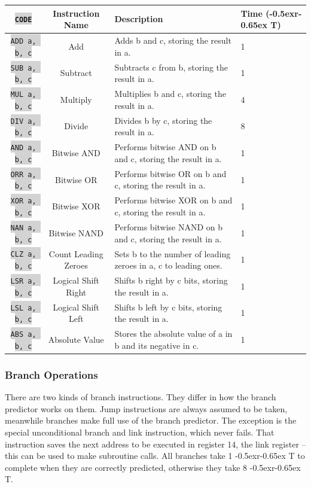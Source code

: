 \documentclass{article}
\newcommand{\vnscode}[1]{\colorbox{lightgray}{\lstinline[language=vns]{#1}}}
\newcommand{\RT}{\lower-0.5ex\hbox{r}\kern-0.65ex T}
\begin{document}
\begin{minipage}{\textwidth}
\label{table:arithmetic}
\centering
\begin{tabular}{|c|c|l|l|}
    \hline \vnscode{CODE} & Instruction Name & Description & Time (\RT) \\ \hline
    \vnscode{ADD a, b, c} & Add & Adds b and c, storing the result in a. & 1 \\ \hline
    \vnscode{SUB a, b, c} & Subtract & Subtracts c from b, storing the result in a. & 1 \\ \hline
    \vnscode{MUL a, b, c} & Multiply & Multiplies b and c, storing the result in a. & 4 \\ \hline
    \vnscode{DIV a, b, c} & Divide & Divides b by c, storing the result in a. & 8 \\ \hline
    \vnscode{AND a, b, c} & Bitwise AND & Performs bitwise AND on b and c, storing the result in a. & 1 \\ \hline
    \vnscode{ORR a, b, c} & Bitwise OR & Performs bitwise OR on b and c, storing the result in a. & 1 \\ \hline
    \vnscode{XOR a, b, c} & Bitwise XOR & Performs bitwise XOR on b and c, storing the result in a. & 1 \\ \hline
    \vnscode{NAN a, b, c} & Bitwise NAND & Performs bitwise NAND on b and c, storing the result in a. & 1 \\ \hline
    \vnscode{CLZ a, b, c} & Count Leading Zeroes & Sets b to the number of leading zeroes in a, c to leading ones. & 1 \\ \hline
    \vnscode{LSR a, b, c} & Logical Shift Right & Shifts b right by c bits, storing the result in a. & 1 \\ \hline
    \vnscode{LSL a, b, c} & Logical Shift Left & Shifts b left by c bits, storing the result in a. & 1 \\ \hline
    \vnscode{ABS a, b, c} & Absolute Value & Stores the absolute value of a in b and its negative in c. & 1 \\ \hline
\end{tabular}
\end{minipage}

\subsubsection{Branch Operations}

There are two kinds of branch instructions. They differ in how the branch
predictor works on them. Jump instructions are always assumed to be taken,
meanwhile branches make full use of the branch predictor. The exception is the
special unconditional branch and link instruction, which never fails. That
instruction saves the next address to be executed in register 14, the link
register -- this can be used to make subroutine calls. All branches take 1 \RT
to complete when they are correctly predicted, otherwise they take 8 \RT.
\end{document}
